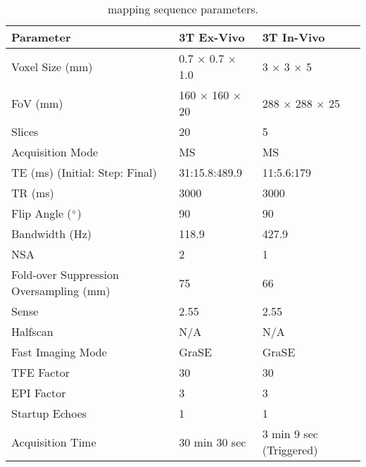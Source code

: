 \begin{table}[H]
	\centering
	\begin{tabularx}{1.0\textwidth}{X|X|X}
	\textbf{Parameter}                      & \textbf{3T Ex-Vivo} & \textbf{3T In-Vivo} \\ \hline
	Voxel Size (mm)                         & 0.7 $\times$ 0.7 $\times$ 1.0     & 3 $\times$ 3 $\times$ 5           \\ \hline
	FoV (mm)                                & 160 $\times$ 160 $\times$ 20      & 288 $\times$ 288 $\times$ 25      \\ \hline
	Slices                                  & 20                  & 5                   \\ \hline
	Acquisition Mode                        & MS                  & MS                  \\ \hline
	TE (ms) (Initial: Step: Final)          & 31:15.8:489.9       & 11:5.6:179          \\ \hline
	TR (ms)                                 & 3000                & 3000                \\ \hline
	Flip Angle ($\degree$)                  & 90                  & 90                  \\ \hline
	Bandwidth (Hz)                          & 118.9               & 427.9               \\ \hline
	NSA                                     & 2                   & 1                   \\ \hline
	Fold-over Suppression Oversampling (mm) & 75                  & 66                  \\ \hline
	Sense                                   & 2.55                & 2.55                \\ \hline
	Halfscan                                & N/A                 & N/A                 \\ \hline
	Fast Imaging Mode                       & GraSE               & GraSE               \\ \hline
	TFE Factor                              & 30                  & 30                  \\ \hline
	EPI Factor                              & 3                   & 3                   \\ \hline
	Startup Echoes                          & 1                   & 1                   \\ \hline
	Acquisition Time                        & 30 min 30 sec       & 3 min 9 sec (Triggered) 
	\end{tabularx}
	\caption{\ttwo mapping sequence parameters.}
	\label{tab:ex_t2_mapping}
\end{table}

